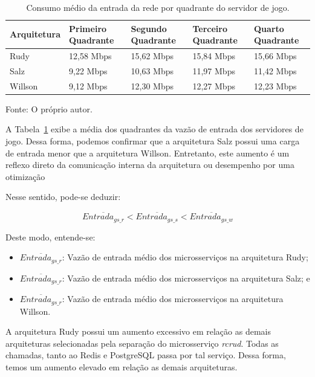 \begin{table}[htb!]
\centering
\begin{adjustbox}{max width=\textwidth}
\caption{Consumo médio da entrada da rede por quadrante do servidor de jogo.}
\label{tab:net_in_gs_media_quadrantes}

\begin{tabular}{|l|l|l|l|l|}
\hline
Arquitetura & Primeiro Quadrante & Segundo Quadrante & Terceiro Quadrante & Quarto Quadrante \\ \hline
Rudy        & 12,58 Mbps            & 15,62 Mbps           & 15,84 Mbps            & 15,66 Mbps          \\ \hline
Salz        & 9,22 Mbps            & 10,63 Mbps           & 11,97 Mbps            & 11,42 Mbps          \\ \hline
Willson     & 9,12 Mbps            & 12,30 Mbps          & 12,27 Mbps            & 12,23 Mbps          \\ \hline
\end{tabular}
\end{adjustbox}

Fonte: O próprio autor.
\end{table}

A Tabela~\ref{tab:net_in_gs_media_quadrantes} exibe a média dos quadrantes da vazão de entrada dos servidores de jogo.
%
Dessa forma, podemos confirmar que a arquitetura Salz possui uma carga de entrada menor que a arquitetura Willson.
%
Entretanto, este aumento é um reflexo direto da comunicação interna da arquitetura ou desempenho por uma otimização

Nesse sentido, pode-se deduzir:

$$
    \overline{Entrada_{gs\_r}} < \overline{Entrada_{gs\_s}} < \overline{Entrada_{gs\_w}}
$$

Deste modo, entende-se:

\begin{itemize}
 \item $\overline{Entrada_{gs\_r}}$: Vazão de entrada médio dos microsserviços na arquitetura Rudy;
 \item $\overline{Entrada_{gs\_r}}$: Vazão de entrada médio dos microsserviços na arquitetura Salz; e
 \item $\overline{Entrada_{gs\_r}}$: Vazão de entrada médio dos microsserviços na arquitetura Willson.
\end{itemize}

A arquitetura Rudy possui um aumento excessivo em relação as demais arquiteturas selecionadas pela separação do microsserviço \textit{rcrud}.
%
Todas as chamadas, tanto ao Redis e PostgreSQL passa por tal serviço.
%
Dessa forma, temos um aumento elevado em relação as demais arquiteturas.

